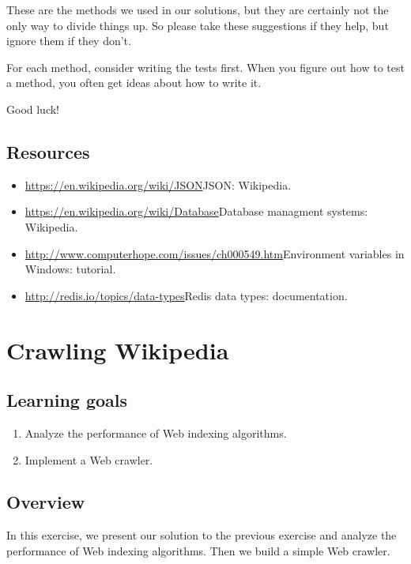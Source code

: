 \documentclass[12pt]{book}
\theoremstyle{exercise}
\begin{document}
{These are the methods we used in our solutions, but they are certainly
not the only way to divide things up. So please take these suggestions
if they help, but ignore them if they don't.

For each method, consider writing the tests first. When you figure out
how to test a method, you often get ideas about how to write it.

Good luck!

\section{Resources}\label{resources-13}

\begin{itemize}
\itemsep1pt\parskip0pt
\item
  \url{https://en.wikipedia.org/wiki/JSON}{JSON}: Wikipedia.
\item
  \url{https://en.wikipedia.org/wiki/Database}{Database managment
  systems}: Wikipedia.
\item
  \url{http://www.computerhope.com/issues/ch000549.htm}{Environment
  variables in Windows}: tutorial.
\item
  \url{http://redis.io/topics/data-types}{Redis data types}:
  documentation. 
\end{itemize}


\chapter{Crawling Wikipedia}

\section{Learning goals}\label{learning-goals-9}

\begin{enumerate}
\def\labelenumi{\arabic{enumi}.}
\itemsep1pt\parskip0pt
\item
  Analyze the performance of Web indexing algorithms.
\item
  Implement a Web crawler.
\end{enumerate}

\section{Overview}\label{overview-17}

In this exercise, we present our solution to the previous exercise and analyze the
performance of Web indexing algorithms. Then we build a simple Web
crawler.

}
\end{document}
